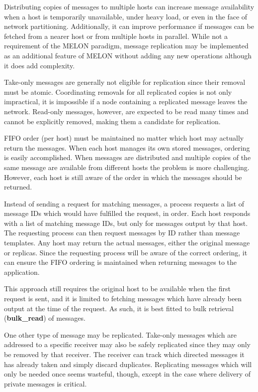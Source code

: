 Distributing copies of messages to multiple hosts can increase message availability when a host is temporarily unavailable, under heavy load, or even in the face of network partitioning. Additionally, it can improve performance if messages can be fetched from a nearer host or from multiple hosts in parallel. While not a requirement of the MELON paradigm, message replication may be implemented as an additional feature of MELON without adding any new operations although it does add complexity.

Take-only messages are generally not eligible for replication since their removal must be atomic. Coordinating removals for all replicated copies is not only impractical, it is impossible if a node containing a replicated message leaves the network. Read-only messages, however, are expected to be read many times and cannot be explicitly removed, making them a candidate for replication.

FIFO order (per host) must be maintained no matter which host may actually return the messages. When each host manages its own stored messages, ordering is easily accomplished. When messages are distributed and multiple copies of the same message are available from different hosts the problem is more challenging. However, each host is still aware of the order in which the messages should be returned.

Instead of sending a request for matching messages, a process requests a list of message IDs which would have fulfilled the request, in order. Each host responds with a list of matching message IDs, but only for messages output by that host. The requesting process can then request messages by ID rather than message templates. Any host may return the actual messages, either the original message or replicas. Since the requesting process will be aware of the correct ordering, it can ensure the FIFO ordering is maintained when returning messages to the application.

This approach still requires the original host to be available when the first request is sent, and it is limited to fetching messages which have already been output at the time of the request. As such, it is best fitted to bulk retrieval (\textbf{bulk\_read}) of messages.

One other type of message may be replicated. Take-only messages which are addressed to a specific receiver may also be safely replicated since they may only be removed by that receiver. The receiver can track which directed messages it has already taken and simply discard duplicates. Replicating messages which will only be needed once seems wasteful, though, except in the case where delivery of private messages is critical.

